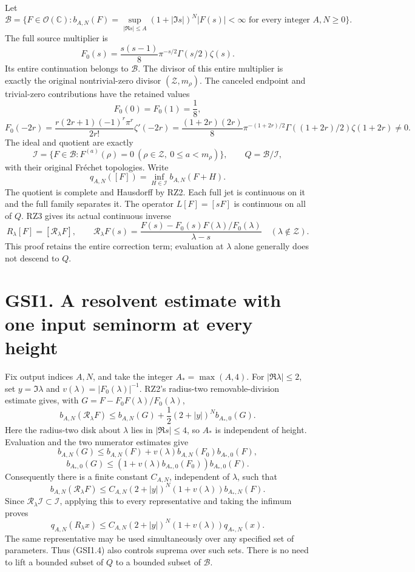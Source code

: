 Let \[
\mathcal B=\{F\in\mathcal O(\mathbb C):
b_{A,N}(F)=\sup_{|\Re s|\le A}(1+|\Im s|)^N|F(s)|<\infty
\text{ for every integer }A,N\ge0\}.
\tag{GSI0.1}
\] The full source multiplier is \[
F_0(s)=\frac{s(s-1)}8\pi^{-s/2}\Gamma(s/2)\zeta(s).
\tag{GSI0.2}
\] Its entire continuation belongs to \(\mathcal B\). The divisor of
this entire multiplier is exactly the original nontrivial-zero divisor
\((\mathscr Z,m_\rho)\). The canceled endpoint and trivial-zero
contributions have the retained values \[
F_0(0)=F_0(1)=\frac18,
\] \[
F_0(-2r)=\frac{r(2r+1)(-1)^r\pi^r}{2r!}\zeta'(-2r)
=\frac{(1+2r)(2r)}8\pi^{-(1+2r)/2}
\Gamma((1+2r)/2)\zeta(1+2r)\ne0.
\tag{GSI0.3}
\] The ideal and quotient are exactly \[
\mathcal I=\{F\in\mathcal B:F^{(a)}(\rho)=0
\ (\rho\in\mathscr Z,\ 0\le a<m_\rho)\},\qquad
Q=\mathcal B/\mathcal I,
\tag{GSI0.4}
\] with their original Fréchet topologies. Write \[
q_{A,N}([F])=\inf_{H\in\mathcal I}b_{A,N}(F+H).
\tag{GSI0.5}
\] The quotient is complete and Hausdorff by RZ2. Each full jet is
continuous on it and the full family separates it. The operator
\(L[F]=[sF]\) is continuous on all of \(Q\). RZ3 gives its actual
continuous inverse \[
R_\lambda[F]=[\mathscr R_\lambda F],\qquad
\mathscr R_\lambda F(s)=
\frac{F(s)-F_0(s)F(\lambda)/F_0(\lambda)}{\lambda-s}
\quad(\lambda\notin\mathscr Z).
\tag{GSI0.6}
\] This proof retains the entire correction term; evaluation at
\(\lambda\) alone generally does not descend to \(Q\).

\section{GSI1. A resolvent estimate with one input seminorm at every
height}\label{gsi1.-a-resolvent-estimate-with-one-input-seminorm-at-every-height}

Fix output indices \(A,N\), and take the integer \(A_*=\max(A,4)\). For
\(|\Re\lambda|\le2\), set \(y=\Im\lambda\) and
\(v(\lambda)=|F_0(\lambda)|^{-1}\). RZ2's radius-two removable-division
estimate gives, with \(G=F-F_0F(\lambda)/F_0(\lambda)\), \[
b_{A,N}(\mathscr R_\lambda F)
\le b_{A,N}(G)+\frac12(2+|y|)^N b_{A_*,0}(G).
\tag{GSI1.1}
\] Here the radius-two disk about \(\lambda\) lies in \(|\Re s|\le4\),
so \(A_*\) is independent of height. Evaluation and the two numerator
estimates give \[
b_{A,N}(G)\le b_{A,N}(F)
+v(\lambda)b_{A,N}(F_0)b_{A_*,0}(F),
\] \[
b_{A_*,0}(G)\le
(1+v(\lambda)b_{A_*,0}(F_0))b_{A_*,0}(F).
\tag{GSI1.2}
\] Consequently there is a finite constant \(C_{A,N}\), independent of
\(\lambda\), such that \[
b_{A,N}(\mathscr R_\lambda F)
\le C_{A,N}(2+|y|)^N(1+v(\lambda))b_{A_*,N}(F).
\tag{GSI1.3}
\] Since \(\mathscr R_\lambda\mathcal I\subset\mathcal I\), applying
this to every representative and taking the infimum proves \[
q_{A,N}(R_\lambda x)
\le C_{A,N}(2+|y|)^N(1+v(\lambda))q_{A_*,N}(x).
\tag{GSI1.4}
\] The same representative may be used simultaneously over any specified
set of parameters. Thus (GSI1.4) also controls suprema over such sets.
There is no need to lift a bounded subset of \(Q\) to a bounded subset
of \(\mathcal B\).

